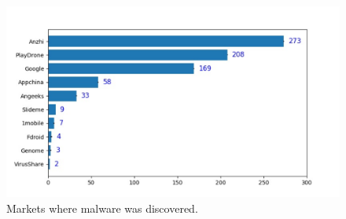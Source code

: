 

\begin{figure}[ht]
\centering
\includegraphics[scale=0.4]{images/stores.pdf}
\caption{Markets where malware was discovered.}
 \label{fig:stores}
\end{figure}





